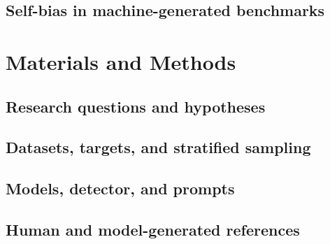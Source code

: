 \documentclass{elektr}
\begin{document}
\subsection*{Self-bias in machine-generated benchmarks}

\section*{Materials and Methods} \label{sec:methods}

\subsection*{Research questions and hypotheses}

\subsection*{Datasets, targets, and stratified sampling}

\subsection*{Models, detector, and prompts}

\subsection*{Human and model-generated references}
\end{document}
